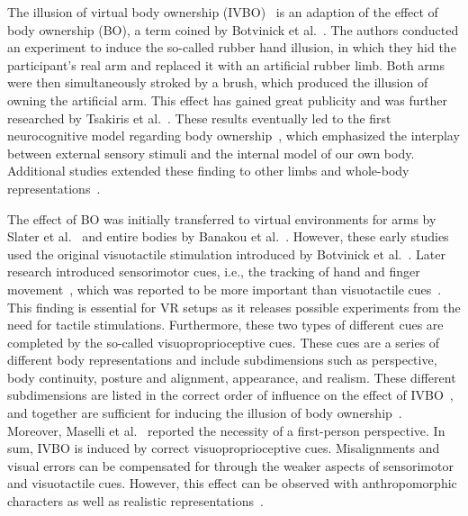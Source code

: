The illusion of virtual body ownership (IVBO)~\cite{lugrin2015anthropomorphism} is an adaption of the effect of body ownership (BO), a term coined by Botvinick et al.~. The authors conducted an experiment to induce the so-called rubber hand illusion, in which they hid the participant’s real arm and replaced it with an artificial rubber limb. Both arms were then simultaneously stroked by a brush, which produced the illusion of owning the artificial arm. This effect has gained great publicity and was further researched by Tsakiris et al.~\cite{tsakiris2005rubber}. These results eventually led to the first neurocognitive model regarding body ownership~\cite{tsakiris2010my}, which emphasized the interplay between external sensory stimuli and the internal model of our own body. Additional studies extended
these finding to other limbs and whole-body representations~\cite{ehrsson2007experimental,petkova2008if,lenggenhager2007video}.


The effect of BO was initially transferred to virtual environments for arms by Slater et al.~ and entire bodies by Banakou et al.~. However, these early studies used the original visuotactile stimulation introduced by Botvinick et al.~. Later research introduced sensorimotor cues, i.e., the tracking of hand and finger movement~\cite{sanchez2010virtual}, which was reported to be more important than visuotactile cues~\cite{slater2010first}. This finding is essential for VR setups as it releases possible experiments from the need for tactile stimulations. Furthermore, these two types of different cues are completed by the so-called visuoproprioceptive cues. These cues are a series of different body representations and include subdimensions such as perspective, body continuity, posture and alignment, appearance, and realism. These different subdimensions are listed in the correct order of influence on the effect of IVBO~\cite{slater2009inducing,slater2010first,perez2012my,maselli2013building}, and together are sufficient for inducing the illusion of body ownership~\cite{maselli2013building}. Moreover, Maselli et al.~ reported the necessity of a first-person perspective. In sum, IVBO is induced by correct visuoproprioceptive cues. Misalignments and visual errors can be compensated for through the weaker aspects of sensorimotor and visuotactile cues. However, this effect can be observed with anthropomorphic characters as well as realistic representations~\cite{lugrin2015anthropomorphism, lin2016need,jo2017impact}.


